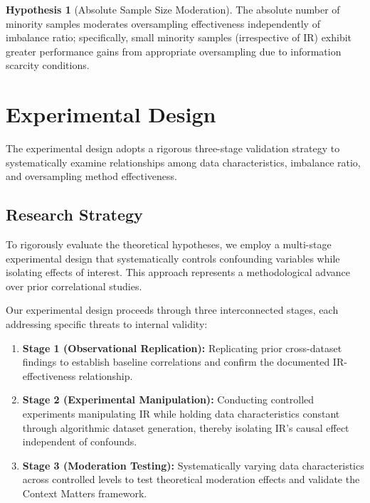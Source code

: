 \documentclass{ijSmartGrid}
\theoremstyle{definition}
\newtheorem{hypothesis}{Hypothesis}
\begin{document}
\begin{hypothesis}[Absolute Sample Size Moderation]
The absolute number of minority samples moderates oversampling effectiveness independently of imbalance ratio; specifically, small minority samples (irrespective of IR) exhibit greater performance gains from appropriate oversampling due to information scarcity conditions.
\label{hyp:h4}
\end{hypothesis}

\section{Experimental Design}
\indent The experimental design adopts a rigorous three-stage validation strategy to systematically examine relationships among data characteristics, imbalance ratio, and oversampling method effectiveness.

\subsection{Research Strategy}
\indent To rigorously evaluate the theoretical hypotheses, we employ a multi-stage experimental design that systematically controls confounding variables while isolating effects of interest. This approach represents a methodological advance over prior correlational studies.

Our experimental design proceeds through three interconnected stages, each addressing specific threats to internal validity:

\begin{enumerate}
    \item \textbf{Stage 1 (Observational Replication):} Replicating prior cross-dataset findings to establish baseline correlations and confirm the documented IR-effectiveness relationship.
    
    \item \textbf{Stage 2 (Experimental Manipulation):} Conducting controlled experiments manipulating IR while holding data characteristics constant through algorithmic dataset generation, thereby isolating IR's causal effect independent of confounds.
    
    \item \textbf{Stage 3 (Moderation Testing):} Systematically varying data characteristics across controlled levels to test theoretical moderation effects and validate the Context Matters framework.
\end{enumerate}
\end{document}
